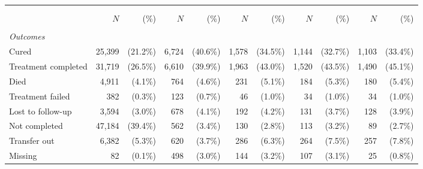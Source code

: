 \scriptsize{
\begin{tabular}{l|rr|rr|rr|rr|rr}
\hline\hline \\[-8pt]
 &  &  &  &  &  \\
 & $N$ & (\%) & $N$ & (\%) & $N$ & (\%) & $N$ & (\%) & $N$ & (\%) \\ \hline \\[-8pt]
\textit{Outcomes} &  &  &  &  &  &  &  &  &  &  \\
\quad Cured & 25,399 & (21.2\%) & 6,724 & (40.6\%) & 1,578 & (34.5\%) & 1,144 & (32.7\%) & 1,103 & (33.4\%) \\
\quad Treatment completed & 31,719 & (26.5\%) & 6,610 & (39.9\%) & 1,963 & (43.0\%) & 1,520 & (43.5\%) & 1,490 & (45.1\%) \\
\quad Died & 4,911 & (4.1\%) & 764 & (4.6\%) & 231 & (5.1\%) & 184 & (5.3\%) & 180 & (5.4\%) \\
\quad Treatment failed & 382 & (0.3\%) & 123 & (0.7\%) & 46 & (1.0\%) & 34 & (1.0\%) & 34 & (1.0\%) \\
\quad Lost to follow-up & 3,594 & (3.0\%) & 678 & (4.1\%) & 192 & (4.2\%) & 131 & (3.7\%) & 128 & (3.9\%) \\
\quad Not completed & 47,184 & (39.4\%) & 562 & (3.4\%) & 130 & (2.8\%) & 113 & (3.2\%) & 89 & (2.7\%) \\
\quad Transfer out & 6,382 & (5.3\%) & 620 & (3.7\%) & 286 & (6.3\%) & 264 & (7.5\%) & 257 & (7.8\%) \\
\quad Missing & 82 & (0.1\%) & 498 & (3.0\%) & 144 & (3.2\%) & 107 & (3.1\%) & 25 & (0.8\%) \\
\hline\hline
\end{tabular}}